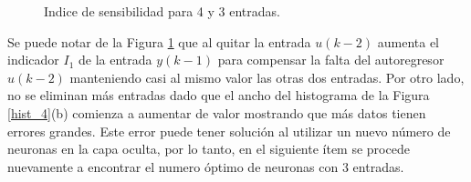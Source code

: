 \documentclass[12pt]{article}
\begin{document}
\begin{itemize}
	\begin{figure}[h!]
		\centering
		\captionsetup{justification=centering}
		\caption{Indice de sensibilidad para 4 y 3 entradas.}
		\label{Ind_4}
	\end{figure}
	Se puede notar de la Figura \ref{Ind_4} que al quitar la entrada $u(k-2)$ aumenta el indicador $I_1$ de la entrada $y(k-1)$ para compensar la falta del autoregresor $u(k-2)$ manteniendo casi al mismo valor las otras dos entradas. Por otro lado, no se eliminan más entradas dado que el ancho del histograma de la Figura \ref{hist_4}(b) comienza a aumentar de valor mostrando que más datos tienen errores grandes. Este error puede tener solución al utilizar un nuevo número de neuronas en la capa oculta, por lo tanto, en el siguiente ítem se procede nuevamente a encontrar el numero óptimo de neuronas con 3 entradas.
	\begin{figure}
		\centering
		\captionsetup{justification=centering}

\end{figure}
\end{itemize}
\end{document}
